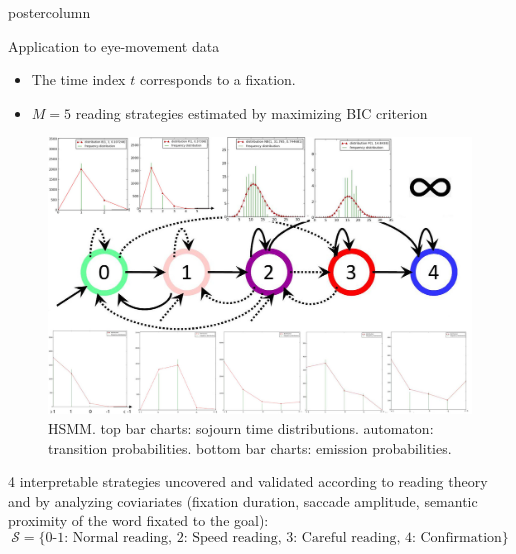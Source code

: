 \documentclass[final,hyperref={pdfpagelabels=false}]{beamer}
\begin{document}
\begin{frame}
\begin{columns}
\begin{column}{.50\textwidth}
\begin{beamercolorbox}[center,wd=\textwidth]{postercolumn}
\begin{minipage}[T]{.98\textwidth}
{            \vfill
            \begin{block}{Application to eye-movement data}
                \begin{itemize}
                    \item[\bullet] The time index $t$ corresponds to a fixation.
                    \item[\bullet] $M = 5$ reading strategies estimated by maximizing BIC criterion
                \end{itemize}
                \begin{figure}[h]
                    \centering
                    \includegraphics[width=32.67cm]{hsmm.jpg}
                    \caption{HSMM. top bar charts: sojourn time distributions.
                    automaton: transition probabilities.
                    bottom bar charts: emission probabilities.}
                \end{figure}
                4 interpretable strategies uncovered and validated according to reading theory and by analyzing coviariates
                (fixation duration, saccade amplitude, semantic proximity of the word fixated to the goal):
                {\small$$\mathcal{S}=\{\text{0-1: Normal reading, 2: Speed reading, 3: Careful reading, 4: Confirmation}\}$$}
                \begin{minipage}{0.47\textwidth}
                    \begin{figure}[h]

\end{figure}
\end{minipage}
\end{block}}
\end{minipage}
\end{beamercolorbox}
\end{column}
\end{columns}
\end{frame}
\end{document}

